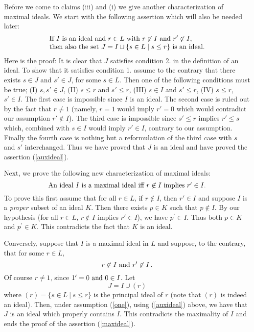 Before we come to claims (iii) and (i) we give another
characterization of maximal ideals. We start with the following
assertion which will also be needed later:
\begin{equation} \label{auxideal}
  \begin{array}{l}
\mbox{\rm If $I$ is an ideal and $r \in L$ with $r \not\in I$
    and $r^\prime\not\in I$,} \\
\mbox{\rm then also the set $J = I \cup \{s \in L \mid s \leq r\}$ is an ideal.}
  \end{array}
\end{equation}
Here is the proof: It is clear that $J$ satisfies condition 2. in the
definition of an ideal. To show
that it satisfies condition 1. assume to the contrary that there exists
$s\in J$ and $s'\in J$, for some $s\in L$.
Then one of the following conditions  must be true;
(I) $s,s'\in J$,
(II) $s\le r$ and $s'\le r$,
(III) $s\in I$ and $s'\le r$,
(IV) $s\le r$, $s'\in I$.
The first case is impossible since $I$ is an ideal.
The second case is ruled out by the fact that $r\neq 1$
(namely, $r=1$ would imply $r'=0$ which would contradict our assumption $r'\not\in I$).
The third case is impossible since $s'\le r$ implies $r'\le s$ which,
combined with $s\in I$ would imply $r'\in I$, contrary to our assumption.
Finally the fourth case is nothing but a reformulation
of the third case with $s$ and $s'$ interchanged.
Thus we have proved that $J$ is an ideal and have proved the assertion
(\ref{auxideal}).

Next, we prove the following new characterization of maximal ideals:
\begin{equation} \label{maxideal}
\mbox{\rm An ideal $I$ is a maximal ideal iff $r \not\in I$ implies $r^\prime \in I$.}
\end{equation}
To prove this first assume that for all $r\in L$, if $r\not \in I$,
then $r'\in I$ and suppose  $I$ is a {\em proper} subset of an ideal $K$.
Then there exists $p\in K$ such that $p\not \in I$.
By our hypothesis
(for all $r\in L$, $r\not \in I$ implies $r'\in I$),
we have  $p^\prime\in I$. Thus both $p\in K$ and
$p^\prime\in K$. This contradicts the fact that $K$ is an ideal.

Conversely, suppose that $I$ is a maximal ideal in $L$ and suppose,
to the contrary, that for some
$r\in L,$
\begin{equation}\label{one}
r\not\in I\ {\rm and}\ r'\not\in I\,.
\end{equation}
Of course $r\neq 1$, since $1'=0\ {\rm and}\ 0\in I$. Let
\begin{equation}\label{two}
J=I\cup(r)
\end{equation}
where $(r)=\{s\in L \ |\ s\le r\}$ is the principal ideal of $r$
(note that $(r)$ is indeed an ideal). Then,
under assumption (\ref{one}), using (\ref{auxideal}) above, we have that
$J$ is an ideal which properly contains $I$. This contradicts
the maximality of $I$ and
ends the proof of the assertion (\ref{maxideal}).

